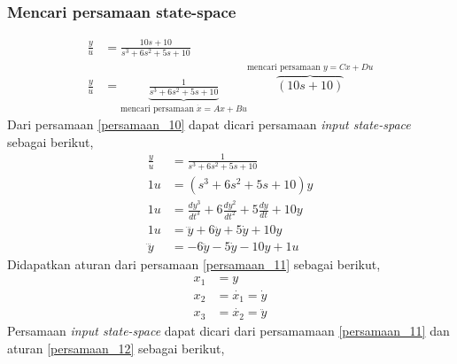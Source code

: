 \documentclass[../cover.tex]{subfiles}
\begin{document}
        \subsubsection{Mencari persamaan state-space}
            \begin{equation}
                \begin{split}
                    \frac{y}{u} &= \frac{10s+10}{s^3+6s^2+5s+10} \\[5pt]
                    \frac{y}{u} &= \underbrace{\frac{1}{s^3+6s^2+5s+10}}_\text{mencari persamaan $\dot{x}=Ax+Bu$} \overbrace{(10s+10)}^\text{mencari persamaan $y=Cx+Du$}
                    \label{persamaan_10}
                \end{split}
            \end{equation}
            Dari persamaan \eqref{persamaan_10} dapat dicari persamaan \textit{input state-space} sebagai berikut,
            \begin{equation}
                \begin{split}
                    \frac{y}{u} &= \frac{1}{s^3+6s^2+5s+10} \\[5pt]
                             1u &= (s^3+6s^2+5s+10)y \\[5pt]
                             1u &= \frac{dy^3}{dt^3} + 6\frac{dy^2}{dt^2} + 5\frac{dy}{dt} + 10y \\[5pt]
                             1u &= \dddot{y} + 6\ddot{y} + 5\dot{y} + 10y \\[5pt]
                       \dddot{y} &= -6\ddot{y} - 5\dot{y} - 10y + 1u
                       \label{persamaan_11}
                \end{split}
            \end{equation}
            Didapatkan aturan dari persamaan \eqref{persamaan_11} sebagai berikut,
            \begin{equation}
                \begin{split}
                    x_1 &= y \\[5pt]
                    x_2 &= \dot{x_1} = \dot{y} \\[5pt]
                    x_3 &= \dot{x_2} = \ddot{y}
                    \label{persamaan_12}
                \end{split}
            \end{equation}
            Persamaan \textit{input state-space} dapat dicari dari persamamaan \eqref{persamaan_11} dan aturan \eqref{persamaan_12} sebagai berikut,
\end{document}
